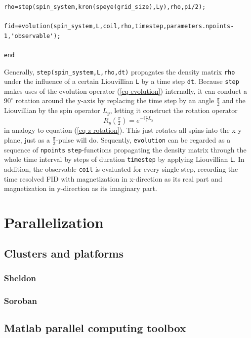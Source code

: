 \documentclass[11.5pt,a4paper]{article}
\begin{document}
\begin{lstlisting}[firstnumber=last]
% Apply the pulse
rho=step(spin_system,kron(speye(grid_size),Ly),rho,pi/2);

fid=evolution(spin_system,L,coil,rho,timestep,parameters.npoints-1,'observable');

end
\end{lstlisting}
Generally, \verb$step(spin_system,L,rho,dt)$ propagates the density matrix \verb$rho$ under the influence of a certain Liouvillian \verb$L$ by a time step \verb$dt$. Because \verb$step$ makes uses of the evolution operator (\ref{eq-evolution}) internally, it can conduct a $90^\circ$ rotation around the y-axis by replacing the time step by an angle $\tfrac{\pi}{2}$ and the Liouvillian by the spin operator $L_y$, letting it construct the rotation operator
\begin{equation}
 R_y (\tfrac{\pi}{2}) = e^{-i \tfrac{\pi}{2} L_y}
\end{equation}
in analogy to equation (\ref{eq-z-rotation}). This just rotates all spins into the x-y-plane, just as a $\tfrac{\pi}{2}$-pulse will do. 
Sequently, \verb$evolution$ can be regarded as a sequence of \verb$npoints$ \verb$step$-functions propagating the density matrix through the whole time interval by steps of duration \verb$timestep$ by applying Liouvillian \verb$L$. In addition, the observable \verb$coil$ is evaluated for every single step, recording the time resolved FID with magnetization in x-direction as its real part and magnetization in y-direction as its imaginary part. 

\section{Parallelization}

\subsection{Clusters and platforms}
\subsubsection{Sheldon}
\subsubsection{Soroban}

\subsection{Matlab parallel computing toolbox}
\end{document}
